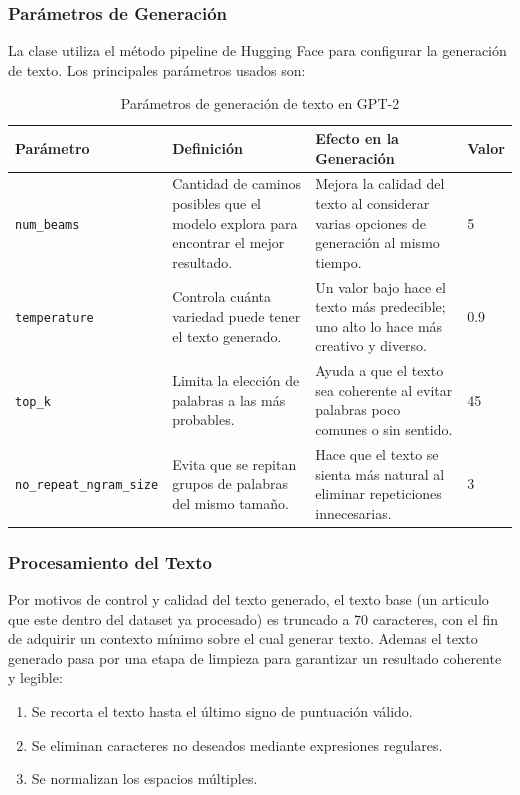 \newpage
\subsubsection{Parámetros de Generación}
La clase utiliza el método pipeline de Hugging Face para configurar la generación de texto. Los principales parámetros usados son:

\begin{table}[H]
\centering
{\small
\begin{tabular}{|l|p{5cm}|p{5cm}|l|}
\hline
\textbf{Par\'ametro} & \textbf{Definici\'on} & \textbf{Efecto en la Generaci\'on} & \textbf{Valor} \\
\hline
\texttt{num\_beams} & Cantidad de caminos posibles que el modelo explora para encontrar el mejor resultado. & Mejora la calidad del texto al considerar varias opciones de generaci\'on al mismo tiempo. & 5 \\
\hline
\texttt{temperature} & Controla cu\'anta variedad puede tener el texto generado. & Un valor bajo hace el texto m\'as predecible; uno alto lo hace m\'as creativo y diverso. & 0.9 \\
\hline
\texttt{top\_k} & Limita la elecci\'on de palabras a las m\'as probables. & Ayuda a que el texto sea coherente al evitar palabras poco comunes o sin sentido. & 45 \\
\hline
\texttt{no\_repeat\_ngram\_size} & Evita que se repitan grupos de palabras del mismo tama\~no. & Hace que el texto se sienta m\'as natural al eliminar repeticiones innecesarias. & 3 \\
\hline
\end{tabular}
}
\caption{Par\'ametros de generaci\'on de texto en GPT-2}
\label{tab:parametros_gpt2}
\end{table}

\subsubsection{Procesamiento del Texto}

Por motivos de control y calidad del texto generado, el texto base (un articulo que este dentro del dataset ya procesado) es truncado a 70 caracteres, con el fin de adquirir un contexto mínimo sobre el cual generar texto. Ademas el texto generado pasa por una etapa de limpieza para garantizar un resultado coherente y legible:

\begin{enumerate}
    \item Se recorta el texto hasta el último signo de puntuación válido.
    \item Se eliminan caracteres no deseados mediante expresiones regulares.
    \item Se normalizan los espacios múltiples.
\end{enumerate}

